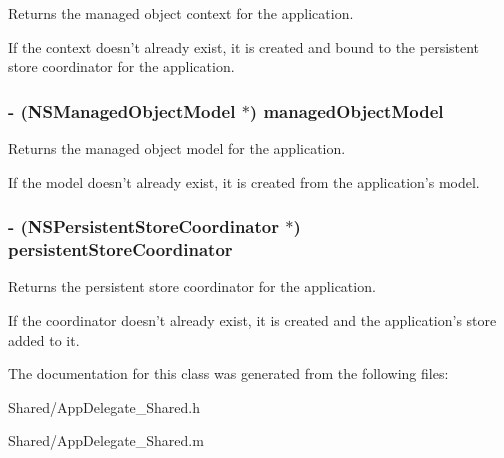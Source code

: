 Returns the managed object context for the application. 

If the context doesn't already exist, it is created and bound to the persistent store coordinator for the application. \hypertarget{interface_app_delegate___shared_a6a08f6b55c56fc3b04ad68252ced94fe}{
\subsubsection[{managedObjectModel}]{\setlength{\rightskip}{0pt plus 5cm}-\/ (NSManagedObjectModel $\ast$) managedObjectModel}}
\label{interface_app_delegate___shared_a6a08f6b55c56fc3b04ad68252ced94fe}


Returns the managed object model for the application. 

If the model doesn't already exist, it is created from the application's model. \hypertarget{interface_app_delegate___shared_a4c656275e182b81c25cc0dadbaa9124c}{
\subsubsection[{persistentStoreCoordinator}]{\setlength{\rightskip}{0pt plus 5cm}-\/ (NSPersistentStoreCoordinator $\ast$) persistentStoreCoordinator}}
\label{interface_app_delegate___shared_a4c656275e182b81c25cc0dadbaa9124c}


Returns the persistent store coordinator for the application. 

If the coordinator doesn't already exist, it is created and the application's store added to it. 

The documentation for this class was generated from the following files:\begin{DoxyCompactItemize}
\item 
Shared/AppDelegate\_\-Shared.h\item 
Shared/AppDelegate\_\-Shared.m\end{DoxyCompactItemize}
